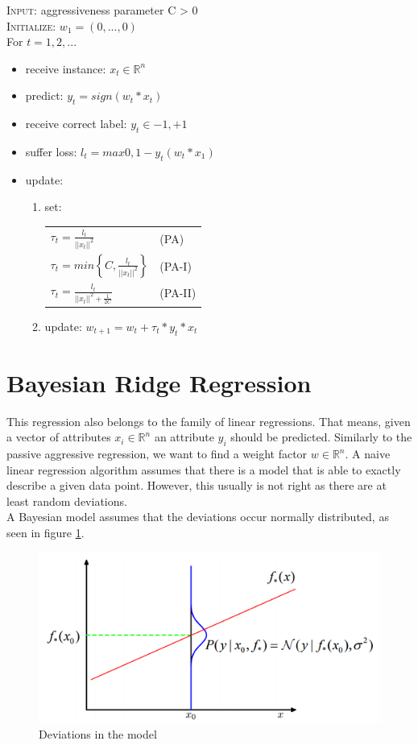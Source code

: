 \documentclass[sigconf]{acmart}
\begin{document}
\noindent
\textsc{Input:} aggressiveness parameter C > 0\\
\textsc{Initialize:} $w_1 = (0, ..., 0)$\\
For $t = 1, 2, ...$
\begin{itemize}
  \item receive instance: $x_t \in \mathbb{R}^n$
  \item predict: $y_t = sign(w_t * x_t)$
  \item receive correct label: $y_t \in {-1, +1}$
  \item suffer loss: $l_t = max{0, 1-y_t(w_t * x_1)}$
  \item update:
  \begin{enumerate}
    \item set:\\
      \begin{tabular}{ l  l }
        $\tau_t = \frac{l_t}{||x_t||^2}$ & (PA)\\
        $\tau_t = min\left\{C, \frac{l_t}{||x_t||^2}\right\}$ & (PA-I)\\
        $\tau_t = \frac{l_t}{||x_t||^2 + \frac{1}{2C}}$ & (PA-II)
      \end{tabular}
    \item update: $w_{t+1} = w_t + \tau_t * y_t * x_t$
  \end{enumerate}
\end{itemize}

\section*{Bayesian Ridge Regression}
This regression also belongs to the family of linear regressions. That means, given a vector of attributes $x_i \in \mathbb{R}^n$ an attribute $y_i$ should be predicted. Similarly to the passive aggressive regression, we want to find a weight factor $w\in \mathbb{R}^n$. A naive linear regression algorithm assumes that there is a model that is able to exactly describe a given data point. However, this usually is not right as there are at least random deviations.\\
A Bayesian model assumes that the deviations occur normally distributed, as seen in figure \ref{img:bayes_func}.\\

\begin{figure}
  \includegraphics[width=\columnwidth]{pictures/Bayer_funktion.png}
  \caption{Deviations in the model}
  \label{img:bayes_func}
\end{figure}
\end{document}
